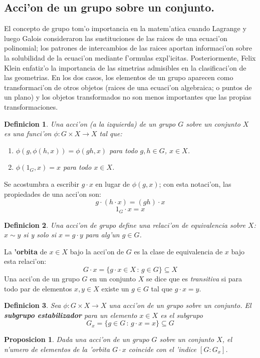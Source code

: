 \documentclass[a4paper,openright,12pt]{report}
\numberwithin{equation}{section} %
\newtheorem{proposicion}{Proposicion}[section] %
\newtheorem{definicion}{Definicion}[section] %
\begin{document}
\subsection{Acci'on de un grupo sobre un conjunto.}
El concepto de grupo tom'o importancia en la matem'atica cuando Lagrange y luego Galois consideraron las sustituciones de las raices de una ecuaci'on polinomial; los patrones de intercambios de las raices aportan informaci'on sobre la solubilidad de la ecuaci'on mediante f'ormulas expl'icitas. Posteriormente, Felix Klein enfatiz'o la importancia de las simetrias admisibles en la clasificaci'on de las geometrias. En los dos casos, los elementos de un grupo aparecen como transformaci'on de otros objetos (raices de una ecuaci'on algebraica; o puntos de un plano) y los objetos transformados no son menos importantes que las propias transformaciones.
\begin{definicion}
Una acci'on (a la izquierda) de un grupo $G$ sobre un conjunto $X$ es una funci'on $\phi : G \times X \rightarrow X$ tal que: 
\begin{enumerate}
\item $\phi(g, \phi(h, x))=\phi(gh, x)$ para todo $g, h \in G$, $x \in X$.
\item $\phi(1_{G},x)=x$ para todo $x \in X$.
\end{enumerate}
\end{definicion}
Se acostumbra a escribir $g \cdot x$ en lugar de $\phi(g,x)$; con esta notaci'on, las propiedades de una acci'on son:
\[
g \cdot (h \cdot x)=(gh)\cdot x
\]
\[
1_{G}\cdot x = x
\]
\begin{definicion}
Una acci'on de grupo define una relaci'on de equivalencia sobre $X$: $x\sim y$ si y solo si $x=g \cdot y$ para alg'un $g \in G$.
\end{definicion}
La \textbf{'orbita} de $x \in X$ bajo la acci'on de $G$ es la clase de equivalencia de $x$ bajo esta relaci'on:
\[
G \cdot x = \{g\cdot x \in X\, :\,g\in G \}\subseteq X
\]
Una acci'on de un grupo $G$ en un conjunto $X$ se dice que es \textit{transitiva} si para todo par de elementos $x,y \in X$ existe un $g \in G$ tal que $g \cdot x = y$. 
\begin{definicion}
Sea $\phi : G \times X \rightarrow X$ una acci'on de un grupo sobre un conjunto. El \textbf{subgrupo estabilizador} para un elemento $x \in X$ es el subgrupo
\[
G_{x}=\{g \in G\,:\,g \cdot x = x  \} \subseteq G
\]
\end{definicion}
\begin{proposicion}
Dada una acci'on de un grupo $G$ sobre un conjunto $X$, el n'umero de elementos de la 'orbita $G \cdot x$ coincide con el 'indice $[G:G_{x}]$.
\end{proposicion}
\end{document}
